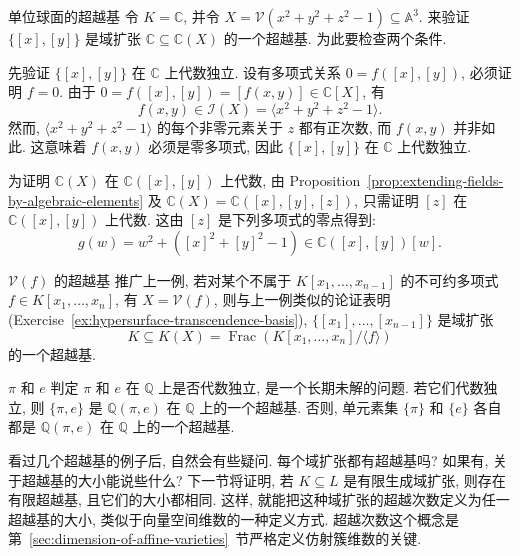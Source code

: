 \begin{Example}{单位球面的超越基}\leavevmode\label{ex:transcendence-basis-of-unit-sphere}
令 $K=\mathbb{C}$, 并令 $X=\mathcal{V}(x^{2}+y^{2}+z^{2}-1)\subseteq\mathbb{A}^{3}$. 来验证 $\{[x],[y]\}$ 是域扩张 $\mathbb{C}\subseteq\mathbb{C}(X)$ 的一个超越基. 为此要检查两个条件.

先验证 $\{[x],[y]\}$ 在 $\mathbb{C}$ 上代数独立. 设有多项式关系 $0=f([x],[y])$, 必须证明 $f=0$. 由于 $0=f([x],[y])=[f(x,y)]\in\mathbb{C}[X]$, 有
\[
  f(x,y)\in\mathcal{I}(X)=\langle x^{2}+y^{2}+z^{2}-1\rangle.
\]
然而, $\langle x^{2}+y^{2}+z^{2}-1\rangle$ 的每个非零元素关于 $z$ 都有正次数, 而 $f(x,y)$ 并非如此. 这意味着 $f(x,y)$ 必须是零多项式, 因此 $\{[x],[y]\}$ 在 $\mathbb{C}$ 上代数独立.

为证明 $\mathbb{C}(X)$ 在 $\mathbb{C}([x],[y])$ 上代数, 由 Proposition~\ref{prop:extending-fields-by-algebraic-elements} 及 $\mathbb{C}(X)=\mathbb{C}([x],[y],[z])$, 只需证明 $[z]$ 在 $\mathbb{C}([x],[y])$ 上代数. 这由 $[z]$ 是下列多项式的零点得到:
\[
  g(w)=w^{2}+([x]^{2}+[y]^{2}-1)\in\mathbb{C}([x],[y])[w].
\]
\end{Example}

\begin{Example}{$\mathcal{V}(f)$ 的超越基}\leavevmode\label{ex:transcendence-basis-of-hypersurface}
推广上一例, 若对某个不属于 $K[x_{1},\ldots,x_{n-1}]$ 的不可约多项式 $f\in K[x_{1},\ldots,x_{n}]$, 有 $X=\mathcal{V}(f)$, 则与上一例类似的论证表明 (Exercise~\ref{ex:hypersurface-transcendence-basis}), $\{[x_{1}],\ldots,[x_{n-1}]\}$ 是域扩张
\[
  K\subseteq K(X)=\operatorname{Frac}(K[x_{1},\ldots,x_{n}]/\langle f\rangle)
\]
的一个超越基.
\end{Example}

\begin{Example}{$\pi$ 和 $e$}\leavevmode\label{ex:pi-and-e-transcendence-basis}
判定 $\pi$ 和 $e$ 在 $\mathbb{Q}$ 上是否代数独立, 是一个长期未解的问题. 若它们代数独立, 则 $\{\pi,e\}$ 是 $\mathbb{Q}(\pi,e)$ 在 $\mathbb{Q}$ 上的一个超越基. 否则, 单元素集 $\{\pi\}$ 和 $\{e\}$ 各自都是 $\mathbb{Q}(\pi,e)$ 在 $\mathbb{Q}$ 上的一个超越基.
\end{Example}

看过几个超越基的例子后, 自然会有些疑问. 每个域扩张都有超越基吗? 如果有, 关于超越基的大小能说些什么? 下一节将证明, 若 $K\subseteq L$ 是有限生成域扩张, 则存在有限超越基, 且它们的大小都相同. 这样, 就能把这种域扩张的超越次数定义为任一超越基的大小, 类似于向量空间维数的一种定义方式. 超越次数这个概念是第~\ref{sec:dimension-of-affine-varieties}~节严格定义仿射簇维数的关键.

